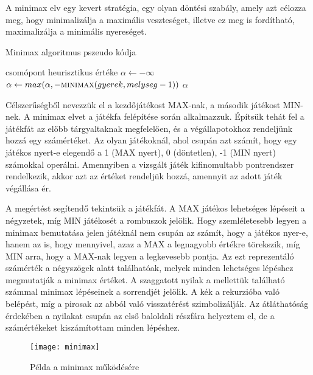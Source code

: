 A minimax elv egy kevert stratégia, egy olyan döntési szabály, amely azt célozza meg, hogy minimalizálja a maximális veszteséget, illetve ez meg is fordítható, maximalizálja a minimális nyereséget. \ujsor

\begin{algorithm}
	\caption{Minimax algoritmus pszeudo kódja}
	\label{alg:minimax}
\begin{algorithmic}[1]
		\State \Return csomópont heurisztikus értéke
	\Else
		\State $\alpha \gets -\infty$
			\State $\alpha \gets max(\alpha, -\Call{minimax}{gyerek, melyseg - 1})$
			\State \Return $\alpha$
		\EndFor
	\EndIf
	\EndFunction
\end{algorithmic}
\end{algorithm}

Célszerűségből nevezzük el a kezdőjátékost MAX-nak, a második játékost MIN-nek. A minimax elvet a játékfa felépítése során alkalmazzuk. Építsük tehát fel a játékfát az előbb tárgyaltaknak megfelelően, és a végállapotokhoz rendeljünk hozzá egy számértéket. Az olyan játékoknál, ahol csupán azt számít, hogy egy játékos nyert-e elegendő a 1 (MAX nyert), 0 (döntetlen), -1 (MIN nyert) számokkal operálni. Amennyiben a vizsgált játék kifinomultabb pontrendszer rendelkezik, akkor azt az értéket rendeljük hozzá, amennyit az adott játék végállása ér.\ujsor


A megértést segítendő tekintsük a  játékfát. A MAX játékos lehetséges lépéseit a négyzetek, míg MIN játékosét a rombuszok jelölik. Hogy szemléletesebb legyen a minimax bemutatása jelen játéknál nem csupán az számít, hogy a játékos nyer-e, hanem az is, hogy mennyivel, azaz a MAX a legnagyobb értékre törekszik, míg MIN arra, hogy a MAX-nak legyen a legkevesebb pontja. Az ezt reprezentáló számérték a négyszögek alatt találhatóak, melyek minden lehetséges lépéshez megmutatják a minimax értéket. A szaggatott nyilak a mellettük található számmal minimax lépéseinek a sorrendjét jelölik. A kék a rekurzióba való belépést, míg a pirosak az abból való visszatérést szimbolizálják. Az átláthatóság érdekében a nyilakat csupán az első baloldali részfára helyeztem el, de a számértékeket kiszámítottam minden lépéshez. \ujsor

\begin{figure}[h]
	\texttt{[image: minimax]}
	\centering
	\caption{Példa a minimax működésére}
	\label{fig:minimax}
\end{figure}

